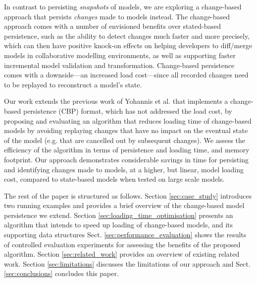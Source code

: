 \documentclass{llncs}
\begin{document}
In contrast to persisting \textit{snapshots} of models, we are exploring a change-based approach that persists \textit{changes} made to models instead. The change-based approach comes with a number of envisioned benefits over stated-based persistence, such as the ability to detect changes much faster and more precisely, which can then have positive knock-on effects on helping developers to diff/merge models in collaborative modelling environments, as well as supporting faster incremental model validation and transformation. Change-based persistence comes with a downside---an increased load cost---since all recorded changes need to be replayed to reconstruct a model's state.   

Our work extends the previous work of Yohannis et al. \cite{yohannis2017turning} that implements a change-based persistence (CBP) format, which has not addressed the load cost, by proposing and evaluating an algorithm that reduces loading time of change-based models by avoiding replaying changes that have no impact on the eventual state of the model (e.g. that are cancelled out by subsequent changes). We assess the efficiency of the algorithm in terms of persistence and loading time, and memory footprint. Our approach demonstrates considerable savings in time for persisting and identifying changes made to models, at a higher, but linear, model loading cost, compared to state-based models when tested on large scale models. 

The rest of the paper is structured as follows. Section \ref{sec:case_study} introduces two running examples and provides a brief overview of the change-based model persistence we extend. Section \ref{sec:loading_time_optimisation} presents an algorithm that intends to speed up loading of change-based models, and its supporting data structures %
Sect. \ref{sec:performance_evaluation} shows the results of controlled evaluation experiments for assessing the benefits of the proposed algorithm. Section \ref{sec:related_work} provides an overview of existing related work. Section \ref{sec:limitations} discusses the limitations of our approach and Sect. \ref{sec:conclusions} concludes this paper.
\end{document}
